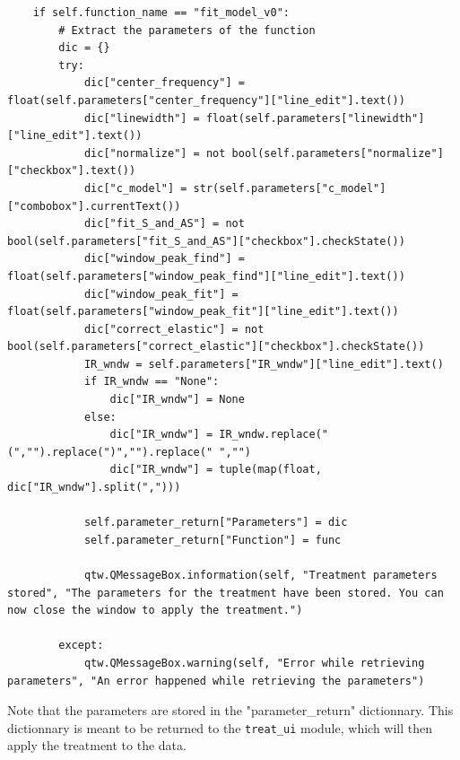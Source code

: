 \documentclass[a4paper,12pt]{article}
\begin{document}
\begin{enumerate}
\begin{lstlisting}
    if self.function_name == "fit_model_v0":
        # Extract the parameters of the function
        dic = {}
        try:
            dic["center_frequency"] = float(self.parameters["center_frequency"]["line_edit"].text())
            dic["linewidth"] = float(self.parameters["linewidth"]["line_edit"].text())
            dic["normalize"] = not bool(self.parameters["normalize"]["checkbox"].text())
            dic["c_model"] = str(self.parameters["c_model"]["combobox"].currentText())
            dic["fit_S_and_AS"] = not bool(self.parameters["fit_S_and_AS"]["checkbox"].checkState())
            dic["window_peak_find"] = float(self.parameters["window_peak_find"]["line_edit"].text()) 
            dic["window_peak_fit"] = float(self.parameters["window_peak_fit"]["line_edit"].text())
            dic["correct_elastic"] = not bool(self.parameters["correct_elastic"]["checkbox"].checkState())
            IR_wndw = self.parameters["IR_wndw"]["line_edit"].text()
            if IR_wndw == "None": 
                dic["IR_wndw"] = None
            else:
                dic["IR_wndw"] = IR_wndw.replace("(","").replace(")","").replace(" ","")
                dic["IR_wndw"] = tuple(map(float, dic["IR_wndw"].split(",")))

            self.parameter_return["Parameters"] = dic
            self.parameter_return["Function"] = func

            qtw.QMessageBox.information(self, "Treatment parameters stored", "The parameters for the treatment have been stored. You can now close the window to apply the treatment.")
        
        except:
            qtw.QMessageBox.warning(self, "Error while retrieving parameters", "An error happened while retrieving the parameters")
\end{lstlisting}
        Note that the parameters are stored in the "parameter\_return" dictionnary. This dictionnary is meant to be returned to the \texttt{treat\_ui} module, which will then apply the treatment to the data.


        \end{enumerate}
    
    
\end{document}
